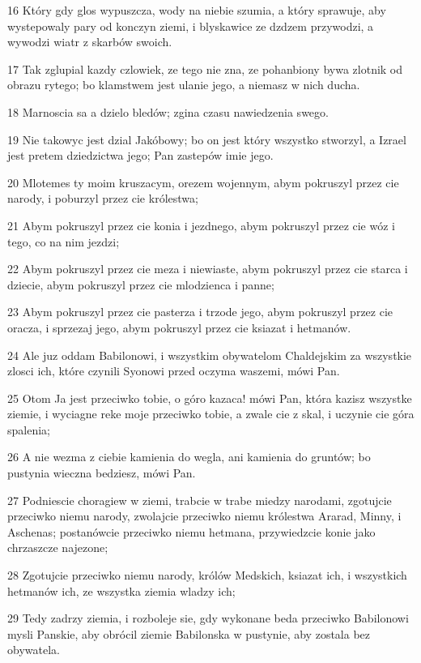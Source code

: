 \par 16 Który gdy glos wypuszcza, wody na niebie szumia, a który sprawuje, aby wystepowaly pary od konczyn ziemi, i blyskawice ze dzdzem przywodzi, a wywodzi wiatr z skarbów swoich.
\par 17 Tak zglupial kazdy czlowiek, ze tego nie zna, ze pohanbiony bywa zlotnik od obrazu rytego; bo klamstwem jest ulanie jego, a niemasz w nich ducha.
\par 18 Marnoscia sa a dzielo bledów; zgina czasu nawiedzenia swego.
\par 19 Nie takowyc jest dzial Jakóbowy; bo on jest który wszystko stworzyl, a Izrael jest pretem dziedzictwa jego; Pan zastepów imie jego.
\par 20 Mlotemes ty moim kruszacym, orezem wojennym, abym pokruszyl przez cie narody, i poburzyl przez cie królestwa;
\par 21 Abym pokruszyl przez cie konia i jezdnego, abym pokruszyl przez cie wóz i tego, co na nim jezdzi;
\par 22 Abym pokruszyl przez cie meza i niewiaste, abym pokruszyl przez cie starca i dziecie, abym pokruszyl przez cie mlodzienca i panne;
\par 23 Abym pokruszyl przez cie pasterza i trzode jego, abym pokruszyl przez cie oracza, i sprzezaj jego, abym pokruszyl przez cie ksiazat i hetmanów.
\par 24 Ale juz oddam Babilonowi, i wszystkim obywatelom Chaldejskim za wszystkie zlosci ich, które czynili Syonowi przed oczyma waszemi, mówi Pan.
\par 25 Otom Ja jest przeciwko tobie, o góro kazaca! mówi Pan, która kazisz wszystke ziemie, i wyciagne reke moje przeciwko tobie, a zwale cie z skal, i uczynie cie góra spalenia;
\par 26 A nie wezma z ciebie kamienia do wegla, ani kamienia do gruntów; bo pustynia wieczna bedziesz, mówi Pan.
\par 27 Podniescie choragiew w ziemi, trabcie w trabe miedzy narodami, zgotujcie przeciwko niemu narody, zwolajcie przeciwko niemu królestwa Ararad, Minny, i Aschenas; postanówcie przeciwko niemu hetmana, przywiedzcie konie jako chrzaszcze najezone;
\par 28 Zgotujcie przeciwko niemu narody, królów Medskich, ksiazat ich, i wszystkich hetmanów ich, ze wszystka ziemia wladzy ich;
\par 29 Tedy zadrzy ziemia, i rozboleje sie, gdy wykonane beda przeciwko Babilonowi mysli Panskie, aby obrócil ziemie Babilonska w pustynie, aby zostala bez obywatela.
